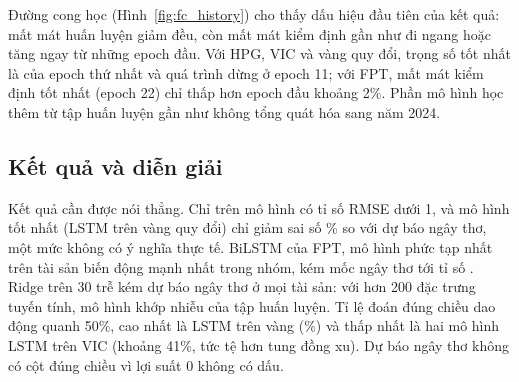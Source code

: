 


Đường cong học (Hình~\ref{fig:fc_history}) cho thấy dấu hiệu đầu tiên của kết quả: mất mát huấn luyện giảm đều,
còn mất mát kiểm định gần như đi ngang hoặc tăng ngay từ những epoch đầu. Với HPG, VIC và vàng quy đổi, trọng số tốt
nhất là của epoch thứ nhất và quá trình dừng ở epoch 11; với FPT, mất mát kiểm định tốt nhất (epoch 22) chỉ thấp hơn
epoch đầu khoảng 2\%. Phần mô hình học thêm từ tập huấn luyện gần như không tổng quát hóa sang năm 2024.

\subsection{Kết quả và diễn giải}


Kết quả cần được nói thẳng. Chỉ  trên  mô hình có tỉ số RMSE dưới 1, và mô hình
tốt nhất (LSTM trên vàng quy đổi) chỉ giảm sai số \% so với dự báo ngây thơ, một mức không có
ý nghĩa thực tế. BiLSTM của FPT, mô hình phức tạp nhất trên tài sản biến động mạnh nhất trong nhóm, kém mốc ngây thơ
tới tỉ số . Ridge trên 30 trễ kém dự báo ngây thơ ở mọi tài sản: với hơn 200 đặc trưng tuyến
tính, mô hình khớp nhiễu của tập huấn luyện. Tỉ lệ đoán đúng chiều dao động quanh 50\%, cao nhất là LSTM trên vàng
(\%) và thấp nhất là hai mô hình LSTM trên VIC (khoảng 41\%, tức tệ hơn tung
đồng xu). Dự báo ngây thơ không có cột đúng chiều
vì lợi suất 0 không có dấu.


